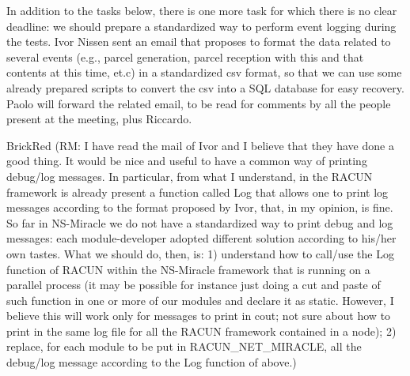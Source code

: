 \documentclass[11pt,journal,draftclsnofoot,onecolumn,twoside,letterpaper]{IEEEtran}
\newcommand{\RM}[1]{\begin{color}{BrickRed} (RM: #1) \end{color}}
\theoremstyle{definition} \newtheorem{definition}[]{Definition}
\theoremstyle{theorem} \newtheorem{theorem}[]{Theorem}
\begin{document}
In addition to the tasks below, there is one more task for which there is no clear deadline: we should prepare a standardized way to perform event logging during the tests. Ivor Nissen sent an email that proposes to format the data related to several events (e.g., parcel generation, parcel reception with this and that contents at this time, et.c) in a standardized csv format, so that we can use some already prepared scripts to convert the csv into a SQL database for easy recovery.
Paolo will forward the related email, to be read for comments by all the people present at the meeting, plus Riccardo.
\RM{I have read the mail of Ivor and I believe that they have done a good thing. It would be nice and useful to have a common way of printing debug/log messages. In particular, from what I understand, in the RACUN framework is already present a function called Log that allows one to print log messages according to the format proposed by Ivor, that, in my opinion, is fine. So far in NS-Miracle we do not have a standardized way to print debug and log messages: each module-developer adopted different solution according to his/her own tastes. What we should do, then, is: 1) understand how to call/use the Log function of RACUN within the NS-Miracle framework that is running on a parallel process (it may be possible for instance just doing a cut and paste of such function in one or more of our modules and declare it as static. However, I believe this will work only for messages to print in cout; not sure about how to print in the same log file for all the RACUN framework contained in a node); 2) replace, for each 
module to be put in RACUN\_NET\_MIRACLE, all the debug/log message according to the Log function of above.}
\end{document}
